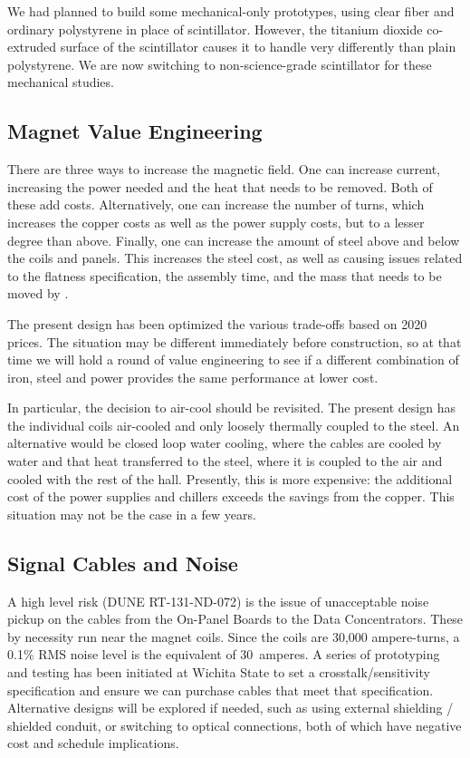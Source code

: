 We had planned to build some mechanical-only prototypes, using clear fiber and ordinary polystyrene in place of scintillator. However, the titanium dioxide co-extruded surface of the scintillator causes it to handle very differently than plain polystyrene. We are now switching to non-science-grade scintillator for these mechanical studies.

\subsection{Magnet Value Engineering}
There are three ways to increase the magnetic field. One can increase current, increasing the power needed and the heat that needs to be removed. Both of these add costs. Alternatively, one can increase the number of turns, which increases the copper costs as well as the power supply costs, but to a lesser degree than above. Finally, one can increase the amount of steel above and below the coils and panels. This increases the steel cost, as well as causing issues related to the flatness specification, the assembly time, and the mass that needs to be moved by .

The present design has been optimized the various trade-offs based on 2020 prices. The situation may be different immediately before construction, so at that time we will hold a round of value engineering to see if a different combination of iron, steel and power provides the same performance at lower cost.

In particular, the decision to air-cool should be revisited. The present design has the individual coils air-cooled and only loosely thermally coupled to the steel. An alternative would be closed loop water cooling, where the cables are cooled by water and that heat transferred to the steel, where it is coupled to the air and cooled with the rest of the hall. Presently, this is more expensive: the additional cost of the power supplies and chillers exceeds the savings from the copper. This situation may not be the case in a few years.

\subsection{Signal Cables and Noise}
A high level risk (DUNE RT-131-ND-072) is the issue of unacceptable noise pickup on the cables from the On-Panel Boards to the Data Concentrators. These by necessity run near the magnet coils. Since the coils are 30,000 ampere-turns, a 0.1\% RMS noise level is the equivalent of 30~amperes. A series of prototyping and testing has been initiated at Wichita State to set a crosstalk/sensitivity specification and ensure we can purchase cables that meet that specification.  Alternative designs will be explored if needed, such as using external shielding / shielded conduit, or switching to optical connections, both of which have negative cost and schedule implications.

